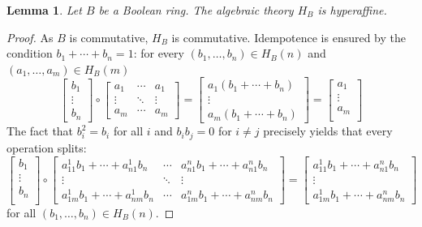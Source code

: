 \documentclass{amsart}
\numberwithin{equation}{section}
\theoremstyle{plain}
\newtheorem{lemma}[theorem]{Lemma}
\theoremstyle{definition}
\begin{document}
\begin{lemma}
  \label{lem:bool-hyper}
  Let $B$ be a Boolean ring. 
  The algebraic theory $H_B$ is hyperaffine. 
\end{lemma}
  \begin{proof}
    As $B$ is commutative, $H_B$ is commutative.
    Idempotence is ensured by the condition $b_1 + \cdots +b_n =1$: for every $(b_1, \ldots, b_n) \in H_B(n)$ and $(a_1, \ldots, a_m)\in H_B(m)$
    \begin{equation*} 
    \begin{bmatrix}
      b_1 \\
      \vdots \\
      b_n 
      \end{bmatrix} \circ  
      \begin{bmatrix}
      a_1 & \cdots & a_1 \\
      \vdots & \ddots & \vdots \\
      a_m & \cdots & a_m
      \end{bmatrix} =
      \begin{bmatrix}
      a_1(b_1 + \cdots + b_n)\\
      \vdots \\
      a_m(b_1 + \cdots + b_n) 
      \end{bmatrix}= 
      \begin{bmatrix}
      a_1 \\
      \vdots \\
      a_m \\
      \end{bmatrix}
\end{equation*} 
    The fact that $b_i ^2= b_i$ for all $i$ and $b_i b_j =0$ for $i \neq j$ precisely yields that every operation splits: 
    \small
    \begin{equation*}
    \begin{bmatrix}
      b_1 \\
      \vdots \\
      b_n \\
      \end{bmatrix} \circ  
      \begin{bmatrix}
      a^1_{11}b_1 + \cdots + a^1_{n1}b_n & \cdots & a^n_{n1}b_1 + \cdots + a^n_{n1}b_n \\
      \vdots & \ddots & \vdots \\
      a^1_{1m}b_1 + \cdots + a^1_{nm}b_n & \cdots & a^n_{1m}b_1 + \cdots + a^n_{nm}b_n
      \end{bmatrix} =
      \begin{bmatrix}
      a^1_{11}b_1 + \cdots + a^n_{n1} b_n\\
      \vdots \\
      a^1_{1m}b_1 + \cdots + a^n_{nm} b_n 
      \end{bmatrix}
    \end{equation*}
    \normalsize
    for all $(b_1, \ldots, b_n) \in H_B(n)$.
\end{proof}
\end{document}
